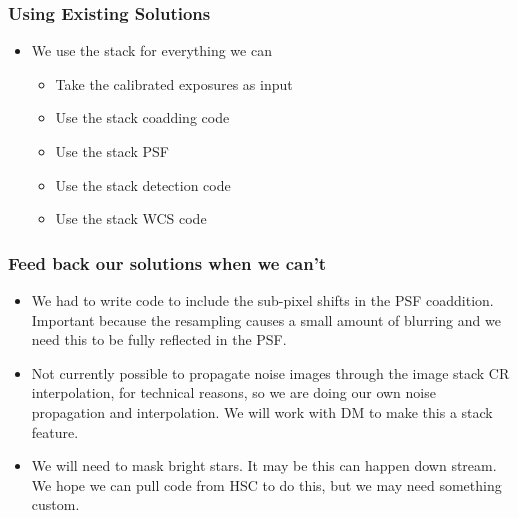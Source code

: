 \documentclass{beamer}
\begin{document}
\frame
{

    \frametitle{Using Existing Solutions}

    \begin{itemize}

                \item We use the stack for everything we can
                    \begin{itemize}

                        \item Take the calibrated exposures as input

                        \item Use the stack coadding code

                        \item Use the stack PSF

                        \item Use the stack detection code

                        \item Use the stack WCS code

                    \end{itemize}

    \end{itemize}

}
\frame
{

    \frametitle{Feed back our solutions when we can't}


    \begin{itemize}


                \item We had to write code to include the sub-pixel shifts in
                    the PSF coaddition.  Important because the resampling
                    causes a small amount of blurring and we need this to be
                    fully reflected in the PSF.

                \item Not currently possible to propagate noise images through the image
                  stack CR interpolation, for technical reasons, so we are doing our own noise
                  propagation and interpolation.  We will work with DM to make
                  this a stack feature.

                \item We will need to mask bright stars. It may be this can
                    happen down stream. We hope we can pull code from HSC to do
                    this, but we may need something custom.



    \end{itemize}

}
\end{document}
